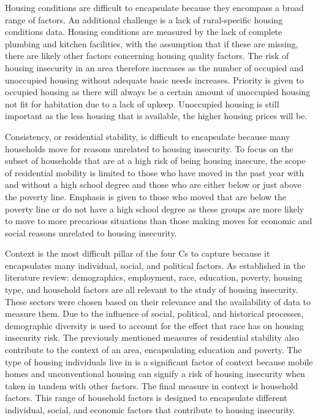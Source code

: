 Housing conditions are difficult to encapsulate because they encompass a broad range of factors. An additional challenge is a lack of rural-specific housing conditions data. Housing conditions are measured by the lack of complete plumbing and kitchen facilities, with the assumption that if these are missing, there are likely other factors concerning housing quality factors. The risk of housing insecurity in an area therefore increases as the number of occupied and unoccupied housing without adequate basic needs increases. Priority is given to occupied housing as there will always be a certain amount of unoccupied housing not fit for habitation due to a lack of upkeep. Unoccupied housing is still important as the less housing that is available, the higher housing prices will be.

Consistency, or residential stability, is difficult to encapsulate because many households move for reasons unrelated to housing insecurity. To focus on the subset of households that are at a high risk of being housing insecure, the scope of residential mobility is limited to those who have moved in the past year with and without a high school degree and those who are either below or just above the poverty line. Emphasis is given to those who moved that are below the poverty line or do not have a high school degree as these groups are more likely to move to more precarious situations than those making moves for economic and social reasons unrelated to housing insecurity. 

Context is the most difficult pillar of the four Cs to capture because it encapsulates many individual, social, and political factors. As established in the literature review: demographics, employment, race, education, poverty, housing type, and household factors are all relevant to the study of housing insecurity. These sectors were chosen based on their relevance and the availability of data to measure them. Due to the influence of social, political, and historical processes, demographic diversity is used to account for the effect that race has on housing insecurity risk. The previously mentioned measures of residential stability also contribute to the context of an area, encapsulating education and poverty. The type of housing individuals live in is a significant factor of context because mobile homes and unconventional housing can signify a risk of housing insecurity when taken in tandem with other factors. The final measure in context is household factors. This range of household factors is designed to encapsulate different individual, social, and economic factors that contribute to housing insecurity. 

